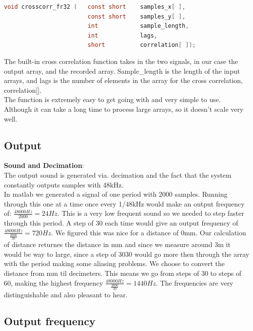 \begin{lstlisting}[language=C]
void crosscorr_fr32 (	const short    samples_x[ ], 
                     	const short    samples_y[ ],
                     	int            sample_length,
                     	int            lags,
                     	short          correlation[ ]);
\end{lstlisting}
The built-in cross correlation function takes in the two signals, in our case the output array, and the recorded array. Sample\_length is the length of the input arrays, and lags is the number of elements in the array for the cross correlation, correlation[].\\
The function is extremely easy to get going with and very simple to use. Although it can take a long time to process large arrays, so it doesn't scale very well.\\
\subsection{Output}
\textbf{Sound and Decimation}:\\
The output sound is generated via. decimation and the fact that the system constantly outputs samples with 48kHz.\\
In matlab we generated a signal of one period with 2000 samples. Running through this one at a time once every 1/48kHz would make an output frequency of: $\frac{48000Hz}{2000}=24Hz$. This is a very low frequent sound so we needed to step faster through this period. A step of 30 each time would give an output frequency of $\frac{48000Hz}{\frac{2000}{30}}=720Hz$. We figured this was nice for a distance of 0mm. Our calculation of distance returnes the distance in mm and since we measure around 3m it would be way to large, since a step of 3030 would go more then through the array with the period making some aliasing problems. We choose to convert the distance from mm til decimeters. This means we go from steps of 30 to steps of 60, making the highest frequency $\frac{48000Hz}{\frac{2000}{30}}=1440Hz$. The frequencies are very distinguishable and also pleasant to hear.\\

\subsection{Output frequency}

